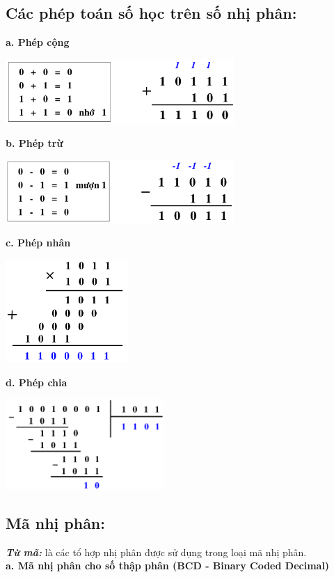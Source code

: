 \subsection{Các phép toán số học trên số nhị phân:}
\noindent\textbf{a. Phép cộng}
\begin{center}
    \includegraphics[width = 0.65\textwidth]{./local/image/5.png}
\end{center}
\textbf{b. Phép trừ}
\begin{center}
    \includegraphics[width = 0.65\textwidth]{./local/image/6.png}
\end{center}
\textbf{c. Phép nhân}
\begin{center}
    \includegraphics[width = 0.35\textwidth]{./local/image/7.png}
\end{center}
\textbf{d. Phép chia}
\begin{center}
    \includegraphics[width = 0.45\textwidth]{./local/image/8.png}
\end{center}
\subsection{Mã nhị phân:}
\textit{\textbf{Từ mã:}} là các tổ hợp nhị phân được sử dụng trong loại mã nhị phân.\\
\textbf{a. Mã nhị phân cho số thập phân (BCD - Binary Coded Decimal)}